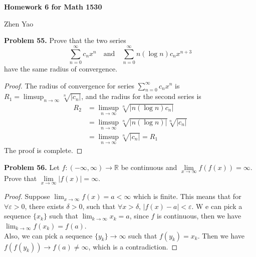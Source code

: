 \documentclass[12pt,leqno]{amsart}
\begin{document}
\centerline{\bf Homework 6 for Math 1530}
\centerline{Zhen Yao}



\bigskip


\noindent
{\bf Problem 55.}
Prove that the two series
$$
\sum_{n=0}^\infty c_n x^n
\quad
\text{and}
\quad
\sum_{n=0}^\infty n(\log n)c_n x^{n+3}
$$
have the same radius of convergence.
\begin{proof}
The radius of convergence for series $\sum_{n=0}^\infty c_n x^n$ is $R_1 = \limsup_{n\to\infty}\sqrt[n]{|c_n|}$, and the radius for the second series is 
\begin{align*}
    R_2 &= \limsup_{n\to\infty}\sqrt[n]{|n(\log n)c_n|}\\
    &= \limsup_{n\to\infty}\sqrt[n]{|n(\log n)|} \sqrt[n]{|c_n|} \\
    &= \limsup_{n\to\infty}\sqrt[n]{|c_n|} = R_1
\end{align*}
The proof is complete.
\end{proof}

\medskip


\noindent
{\bf Problem 56.}
Let $f:(-\infty,\infty)\rightarrow\mathbb R$ be continuous and $\lim\limits_{x\rightarrow\infty}f(f(x))=\infty$.
Prove that $\displaystyle \lim\limits_{x\rightarrow\infty}|f(x)|=\infty$.
\begin{proof}
Suppose $\lim_{x\to\infty}f(x) = a<\infty$ which is finite. This means that for $\forall \varepsilon>0$, there exists $\delta >0$, such that $\forall x>\delta$, $|f(x)-a|<\varepsilon$. W e can pick a sequence $\{x_k\}$ such that $\lim_{k\to\infty}x_k=a$, since $f$ is continuous, then we have $\lim_{k\to\infty}f(x_k)=f(a)$. \\
\hspace*{3em}Also, we can pick a sequence $\{y_k\}\rightarrow \infty$ such that $f(y_k)=x_k$. Then we have $f(f(y_k))\rightarrow f(a)\neq \infty$, which is a contradiction.
\end{proof}

\medskip
\end{document}
